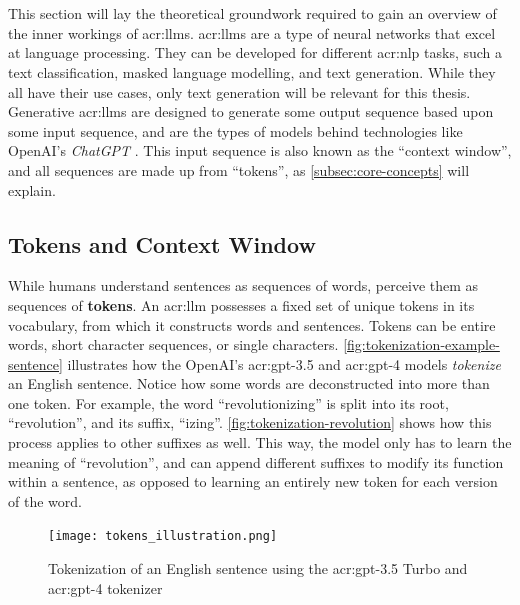 \section[Large Language Models]{}
\label{sec:llms}

This section will lay the theoretical groundwork required to gain an overview of the inner workings of \glspl{acr:llm}. \glspl{acr:llm} are a type of neural networks that excel at language processing. They can be developed for different \gls{acr:nlp} tasks, such a text classification, masked language modelling, and text generation. While they all have their use cases, only text generation will be relevant for this thesis. Generative \glspl{acr:llm} are designed to generate some output sequence based upon some input sequence, and are the types of models behind technologies like OpenAI's \textit{ChatGPT} \citep{openaiIntroducingChatGPT2022}. This input sequence is also known as the \enquote{context window}, and all sequences are made up from \enquote{tokens}, as \autoref{subsec:core-concepts} will explain.


\subsection{Tokens and Context Window}
\label{subsec:core-concepts}

While humans understand sentences as sequences of words,  perceive them as sequences of \textbf{tokens}. An \acrshort{acr:llm} possesses a fixed set of unique tokens in its vocabulary, from which it constructs words and sentences. Tokens can be entire words, short character sequences, or single characters. \autoref{fig:tokenization-example-sentence} illustrates how the OpenAI's \acrshort{acr:gpt}-3.5 and \acrshort{acr:gpt}-4 models \textit{tokenize} an English sentence. Notice how some words are deconstructed into more than one token. For example, the word \enquote{revolutionizing} is split into its root, \enquote{revolution}, and its suffix, \enquote{izing}. \autoref{fig:tokenization-revolution} shows how this process applies to other suffixes as well. This way, the model only has to learn the meaning of \enquote{revolution}, and can append different suffixes to modify its function within a sentence, as opposed to learning an entirely new token for each version of the word.

\begin{figure}[htp]
    \centering
    \texttt{[image: tokens\_illustration.png]}
    \caption{Tokenization of an English sentence using the \acrshort{acr:gpt}-3.5 Turbo and \acrshort{acr:gpt}-4 tokenizer}
    \label{fig:tokenization-example-sentence}
\end{figure}

